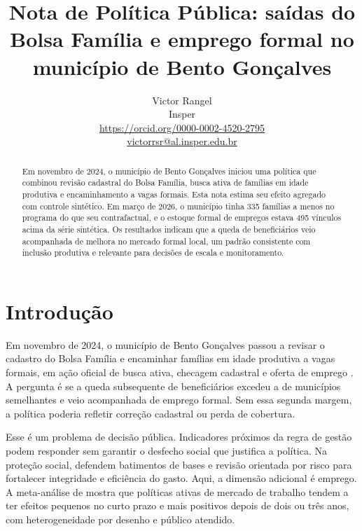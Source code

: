 \documentclass[10pt]{article}
\title{\vspace{-1.35cm}\textbf{Nota de Política Pública: saídas do Bolsa Família e emprego formal no município de Bento Gonçalves}}
\author{Victor Rangel\\[-1pt]{\normalsize Insper}\\[-1pt]{\normalsize \href{https://orcid.org/0000-0002-4520-2795}{https://orcid.org/0000-0002-4520-2795}}\\[-1pt]{\normalsize \href{mailto:victorrsr@al.insper.edu.br}{victorrsr@al.insper.edu.br}}}
\date{}
\begin{document}
\maketitle
\vspace{-0.55cm}
\begin{abstract}
\noindent Em novembro de 2024, o município de Bento Gonçalves iniciou uma política que combinou revisão cadastral do Bolsa Família, busca ativa de famílias em idade produtiva e encaminhamento a vagas formais. Esta nota estima seu efeito agregado com controle sintético. Em março de 2026, o município tinha 335 famílias a menos no programa do que seu contrafactual, e o estoque formal de empregos estava 495 vínculos acima da série sintética. Os resultados indicam que a queda de beneficiários veio acompanhada de melhora no mercado formal local, um padrão consistente com inclusão produtiva e relevante para decisões de escala e monitoramento.
\end{abstract}
\vspace{0.05cm}
\vspace{0.25cm}

\section{Introdução}

Em novembro de 2024, o município de Bento Gonçalves passou a revisar o cadastro do Bolsa Família e encaminhar famílias em idade produtiva a vagas formais, em ação oficial de busca ativa, checagem cadastral e oferta de emprego \citep{prefeiturabento2025bolsafamilia}. A pergunta é se a queda subsequente de beneficiários excedeu a de municípios semelhantes e veio acompanhada de emprego formal. Sem essa segunda margem, a política poderia refletir correção cadastral ou perda de cobertura.

Esse é um problema de decisão pública. Indicadores próximos da regra de gestão podem responder sem garantir o desfecho social que justifica a política. Na proteção social, \citet{pradofirpo2026integridade} defendem batimentos de bases e revisão orientada por risco para fortalecer integridade e eficiência do gasto. Aqui, a dimensão adicional é emprego. A meta-análise de \citet{card2018what} mostra que políticas ativas de mercado de trabalho tendem a ter efeitos pequenos no curto prazo e mais positivos depois de dois ou três anos, com heterogeneidade por desenho e público atendido.
\end{document}
